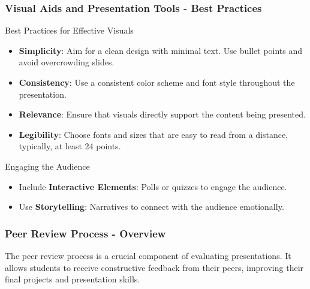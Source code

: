 \documentclass{beamer}
\begin{document}
\begin{frame}[fragile]
    \frametitle{Visual Aids and Presentation Tools - Best Practices}
    \begin{block}{Best Practices for Effective Visuals}
        \begin{itemize}
            \item \textbf{Simplicity}: Aim for a clean design with minimal text. Use bullet points and avoid overcrowding slides.
            \item \textbf{Consistency}: Use a consistent color scheme and font style throughout the presentation.
            \item \textbf{Relevance}: Ensure that visuals directly support the content being presented.
            \item \textbf{Legibility}: Choose fonts and sizes that are easy to read from a distance, typically, at least 24 points.
        \end{itemize}
    \end{block}
    
    \begin{block}{Engaging the Audience}
        \begin{itemize}
            \item Include \textbf{Interactive Elements}: Polls or quizzes to engage the audience.
            \item Use \textbf{Storytelling}: Narratives to connect with the audience emotionally.
        \end{itemize}
    \end{block}
\end{frame}

\begin{frame}[fragile]
    \frametitle{Peer Review Process - Overview}
    The peer review process is a crucial component of evaluating presentations. It allows students to receive constructive feedback from their peers, improving their final projects and presentation skills.
\end{frame}
\end{document}
